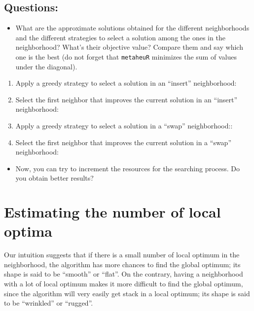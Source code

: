 \documentclass[
]{article}
\providecommand{\tightlist}{%
  \setlength{\itemsep}{0pt}\setlength{\parskip}{0pt}}
\begin{document}
\hypertarget{questions-1}{%
\subsection{Questions:}\label{questions-1}}

\begin{itemize}
\tightlist
\item
  What are the approximate solutions obtained for the different
  neighborhoods and the different strategies to select a solution among
  the ones in the neighborhood? What's their objective value? Compare
  them and say which one is the best (do not forget that
  \texttt{metaheuR} minimizes the sum of values under the diagonal).
\end{itemize}

\begin{enumerate}
\def\labelenumi{\arabic{enumi})}
\item
  Apply a greedy strategy to select a solution in an ``insert''
  neighborhood:
\item
  Select the first neighbor that improves the current solution in an
  ``insert'' neighborhood:
\item
  Apply a greedy strategy to select a solution in a ``swap''
  neighborhood::
\item
  Select the first neighbor that improves the current solution in a
  ``swap'' neighborhood:
\end{enumerate}

\begin{itemize}
\tightlist
\item
  Now, you can try to increment the resources for the searching process.
  Do you obtain better results?
\end{itemize}

\hypertarget{estimating-the-number-of-local-optima}{%
\section{Estimating the number of local
optima}\label{estimating-the-number-of-local-optima}}

Our intuition suggests that if there is a small number of local optimum
in the neighborhood, the algorithm has more chances to find the global
optimum; its shape is said to be ``smooth'' or ``flat''. On the
contrary, having a neighborhood with a lot of local optimum makes it
more difficult to find the global optimum, since the algorithm will very
easily get stack in a local optimum; its shape is said to be
``wrinkled'' or ``rugged''.
\end{document}
